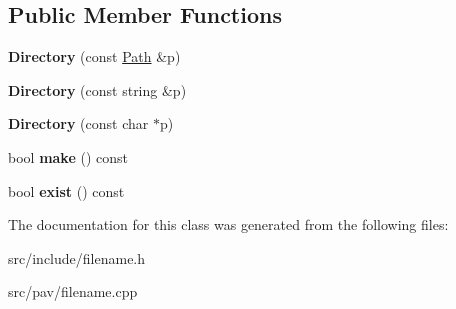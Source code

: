 \subsection*{Public Member Functions}
\begin{DoxyCompactItemize}
\item 
\mbox{\label{classupc_1_1Directory_a4b6321fb7644d3dcf225e2e666b837da}} 
{\bfseries Directory} (const \hyperlink{classupc_1_1Path}{Path} \&p)
\item 
\mbox{\label{classupc_1_1Directory_aca9acc226940f166429185989023727f}} 
{\bfseries Directory} (const string \&p)
\item 
\mbox{\label{classupc_1_1Directory_afb8c8e0bc50664d8505e0fa392f99657}} 
{\bfseries Directory} (const char $\ast$p)
\item 
\mbox{\label{classupc_1_1Directory_ac1ea823e51c240b8f90e6057f2694bd5}} 
bool {\bfseries make} () const
\item 
\mbox{\label{classupc_1_1Directory_a110a8b694850028b67a30167fd8bc575}} 
bool {\bfseries exist} () const
\end{DoxyCompactItemize}


The documentation for this class was generated from the following files\+:\begin{DoxyCompactItemize}
\item 
src/include/filename.\+h\item 
src/pav/filename.\+cpp\end{DoxyCompactItemize}
